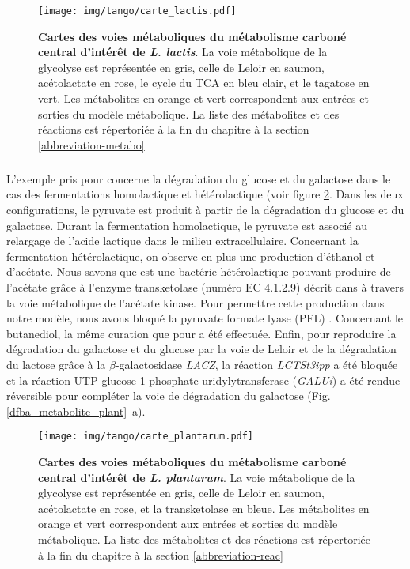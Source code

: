 \begin{figure}[H]
    \centering
    \texttt{[image: img/tango/carte\_lactis.pdf]}
    \caption{\textbf{Cartes des voies métaboliques du métabolisme carboné central d'intérêt de \textit{L. lactis}}. La voie métabolique de la glycolyse est représentée en gris, celle de Leloir en saumon, acétolactate en rose, le cycle du TCA en bleu clair, et le tagatose en vert. Les métabolites en orange et vert correspondent aux entrées et sorties du modèle métabolique. La liste des métabolites et des réactions est répertoriée à la fin du chapitre à la section \ref{abbreviation-metabo} }
    \label{figure:metabolic_map_lactis}
\end{figure}

\subparagraph*{\plantarum}
L'exemple pris pour \plantarum concerne la dégradation du glucose et du galactose dans le cas des fermentations homolactique et hétérolactique (voir figure \ref{figure:metabolic_map_plantarum}. Dans les deux configurations, le pyruvate est produit à partir de la dégradation du glucose et du galactose. Durant la fermentation homolactique, le pyruvate est associé au relargage de l'acide lactique dans le milieu extracellulaire. Concernant la fermentation hétérolactique, on observe en plus une production d'éthanol et d'acétate. Nous savons que \plantarum est une bactérie hétérolactique pouvant produire de l'acétate grâce à l'enzyme transketolase (numéro EC 4.1.2.9) décrit dans \citep{Abedi2020} à travers la voie métabolique de l'acétate kinase. Pour permettre cette production dans notre modèle, nous avons bloqué la pyruvate formate lyase (PFL) \citep{Quatravaux2006}. Concernant le butanediol, la même curation que pour \lactis a été effectuée. Enfin, pour reproduire la dégradation du galactose et du glucose par la voie de Leloir et de la dégradation du lactose grâce à la $\beta$-galactosidase \textit{LACZ}, la réaction \textit{LCTSt3ipp} a été bloquée et la réaction UTP-glucose-1-phosphate uridylytransferase (\textit{GALUi}) a été rendue réversible pour compléter la voie de dégradation du galactose (Fig. \ref{dfba_metabolite_plant}~a).


\begin{figure}[H]
    \centering
    \texttt{[image: img/tango/carte\_plantarum.pdf]}
    \caption{\textbf{Cartes des voies métaboliques  du métabolisme carboné central d'intérêt de \textit{L. plantarum}}. La voie métabolique de la glycolyse est représentée en gris, celle de Leloir en saumon, acétolactate en rose, et la transketolase en bleue. Les métabolites en orange et vert correspondent aux entrées et sorties du modèle métabolique. La liste des métabolites et des réactions est répertoriée à la fin du chapitre à la  section \ref{abbreviation-reac}}
    \label{figure:metabolic_map_plantarum}
\end{figure}

